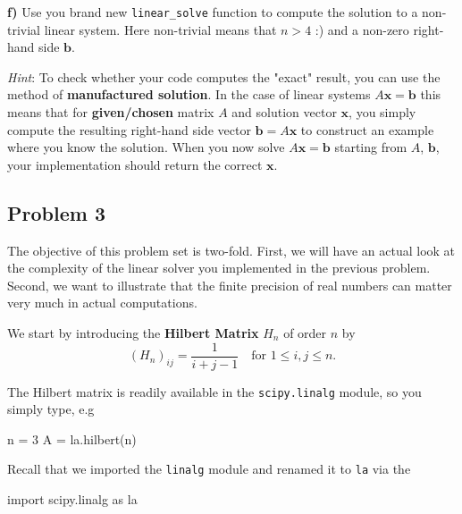 \documentclass[11pt]{article}
\newenvironment{Shaded}{}{}
\newcommand{\DecValTok}[1]{\textcolor[rgb]{0.25,0.63,0.44}{{#1}}}
\newcommand{\NormalTok}[1]{{#1}}
\newcommand{\ImportTok}[1]{{#1}}
\newcommand{\OperatorTok}[1]{\textcolor[rgb]{0.40,0.40,0.40}{{#1}}}
\begin{document}
    \textbf{f)} Use you brand new \texttt{linear\_solve} function to compute
the solution to a non-trivial linear system. Here non-trivial means that
\(n > 4\) :) and a non-zero right-hand side \(\boldsymbol{b}\).

\emph{Hint}: To check whether your code computes the "exact" result, you
can use the method of \textbf{manufactured solution}. In the case of
linear systems \(A \boldsymbol{x} = \boldsymbol{b}\) this means that for
\textbf{given/chosen} matrix \(A\) and solution vector
\(\boldsymbol{x}\), you simply compute the resulting right-hand side
vector \(\boldsymbol{b} = A \boldsymbol{x}\) to construct an example
where you know the solution. When you now solve
\(A\boldsymbol{x} = \boldsymbol{b}\) starting from \(A\),
\(\boldsymbol{b}\), your implementation should return the correct
\(\boldsymbol{x}\).

    \subsection{Problem 3}\label{problem-3}

The objective of this problem set is two-fold. First, we will have an
actual look at the complexity of the linear solver you implemented in
the previous problem. Second, we want to illustrate that the finite
precision of real numbers can matter very much in actual computations.

We start by introducing the \textbf{Hilbert Matrix} \(H_n\) of order
\(n\) by \[ 
(H_n)_{ij} = \dfrac{1}{i+j-1} \quad \text{for } 1 \leqslant i,j \leqslant n.
\]

The Hilbert matrix is readily available in the \texttt{scipy.linalg}
module, so you simply type, e.g

\begin{Shaded}
\begin{Highlighting}[]
\NormalTok{n }\OperatorTok{=} \DecValTok{3}
\NormalTok{A }\OperatorTok{=}\NormalTok{ la.hilbert(n)}
\end{Highlighting}
\end{Shaded}

Recall that we imported the \texttt{linalg} module and renamed it to
\texttt{la} via the

\begin{Shaded}
\begin{Highlighting}[]
\ImportTok{import}\NormalTok{ scipy.linalg }\ImportTok{as}\NormalTok{ la}
\end{Highlighting}
\end{Shaded}
\end{document}
